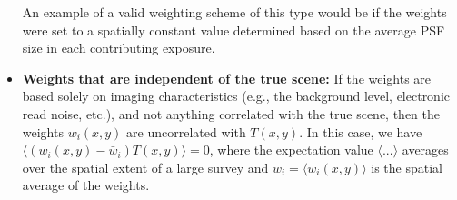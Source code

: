 \documentclass{aastex63}
\newcommand{\irresponse}[1]{{#1}}
\begin{document}
\begin{itemize}
    \irresponse{An example of a valid weighting scheme of this type would be if the weights were set to a spatially constant value determined based on the average PSF size in each contributing exposure.}
    
    \item \textbf{Weights that are independent of the true scene:}  If the weights are based solely on imaging characteristics (e.g., the background level, electronic read noise, etc.), and not anything correlated with the true scene, then the weights $w_i(x,y)$ are uncorrelated with $T(x,y)$.
    In this case, we have $\langle (w_i(x,y)-\bar w_i) T(x,y) \rangle = 0$, where \irresponse{the expectation value $\langle ...\rangle$ averages over the spatial extent of a large survey and} $\bar{w}_i = \langle w_i(x,y)\rangle$ is the spatial average of the weights.  
    

\end{itemize}
\end{document}
